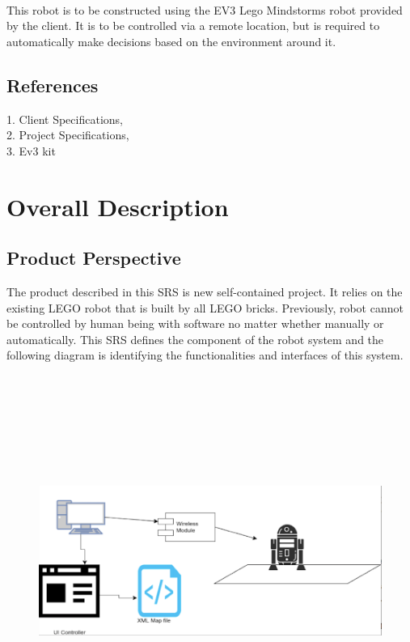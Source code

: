 \documentclass[10pt,a4paper,titlepage]{article}
\begin{document}
	\paragraph{}
This robot is to be constructed using the EV3 Lego Mindstorms robot provided by the client. It is to be controlled via a remote location, but is required to automatically make decisions based on the environment around it.

	\subsection{References}
1. Client Specifications, \\
2. Project Specifications, \\
3. Ev3 kit
	
	\section{Overall Description}
\subsection{Product Perspective}
The product described in this SRS is new self-contained project. It relies on the existing LEGO robot that is built by all LEGO bricks. Previously, robot cannot be controlled by human being with software no matter whether manually or automatically. This SRS defines the component of the robot system and the following diagram is identifying the functionalities and interfaces of this system.\\\\\\\\\\\\\\\\
\begin{figure}
	\includegraphics[width=\linewidth]{Robot_system.PNG}
	
\end{figure}
\end{document}
